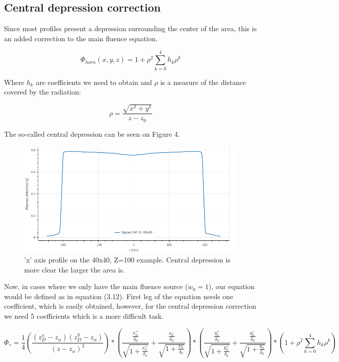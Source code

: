 \documentclass[openany]{article}
\begin{document}
\subsection{Central depression correction}

Since most profiles present a depression surrounding the center of the area, this is an added correction to the main fluence equation.

\begin{equation}
    \Phi_{horn}(x,y,z) = 1+ \rho^2 \sum_{k=0}^4 h_k \rho^k
    
\end{equation}


Where \(h_k\) are coefficients we need to obtain and \(\rho\) is a measure of the distance covered by the radiation:

\begin{equation}
    \rho = \frac{\sqrt{x^2 + y^2}}{z-z_0}
\end{equation}


The so-called central depression can be seen on Figure 4.


\begin{figure}[!h]
    \centering
    \includegraphics[width=\textwidth]{Central_Depression.png}
    \caption{'x' axis profile on the 40x40, Z=100 example. Central depression is more clear the larger the area is.}
    \label{fig:my_label}
\end{figure}




Now, in cases where we only have the main fluence source (\(w_0 = 1\)), our equation would be defined as in equation (3.12). First leg of the equation needs one coefficient, which is easily obtained, however, for the central depression correction we need 5 coefficients which is a more difficult task.

\begin{equation}
    \Phi_\gamma = \frac{1}{4} (\frac{(z_D^x - z_\alpha) (z^y_D - z_\alpha )}{(z-z_\alpha)^2})*(\frac{\frac{x_0^+}{\delta_0}}{\sqrt{1+\frac{x_0^+}{\delta_0}}} + \frac{\frac{x_0^-}{\delta_0}}{\sqrt{1+\frac{x_0^-}{\delta_0}}}) * (\frac{\frac{y_0^+}{\delta_0}}{\sqrt{1+\frac{y_0^+}{\delta_0}}} + \frac{\frac{y_0^-}{\delta_0}}{\sqrt{1+\frac{y_0^-}{\delta_0}}}) * ( 1+ \rho^2 \sum_{k=0}^4 h_k \rho^k)
\end{equation}
\end{document}
